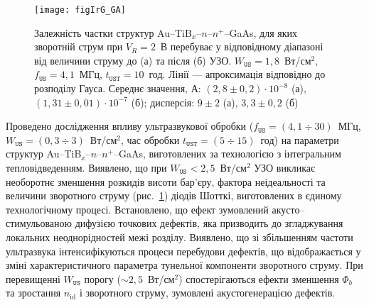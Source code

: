 \begin{figure}[b]
\center
\texttt{[image: figIrG\_GA]}%
\caption{\label{figIrG_GA}
Залежність частки структур Au--TiB$_x$--$n$--$n^+$--GaAs, для яких зворотній струм при $V_R=2$~В перебуває у відповідному діапазоні
від величини струму
до (а) та після (б) УЗО.
$W_\mathtt{US}=1,8$~Вт/см$^2$, $f_\mathtt{US}=4,1$~МГц, $t_\mathtt{UST}=10$~год.
Лінії --- апроксимація відповідно до розподілу Гауса.
Середнє значення, А:
$(2,8\pm0,2)\cdot10^{-8}$ (а),
$(1,31\pm0,01)\cdot10^{-7}$ (б);
дисперсія:
$9\pm2$ (а),
$3,3\pm0,2$ (б)
}
\end{figure}


Проведено дослідження впливу ультразвукової обробки
($f_\mathtt{US}=(4,1\div30)$~МГц, $W_\mathtt{US}=(0,3\div3)$~Вт/см$^2$, час обробки $t_\mathtt{UST}=(5\div15)$~год) на параметри структур
Au--TiB$_x$--$n$--$n^+$--GaAs, виготовлених
за технологією з інтегральним тепловідведенням.
Виявлено, що при $W_\mathtt{US}<2,5$~Вт/см$^2$ УЗО викликає необоротнє зменшення розкидів висоти бар'єру, фактора неідеальності та величини зворотного струму (рис.~\ref{figIrG_GA})
діодів Шотткі, виготовлених в єдиному технологічному процесі.
Встановлено, що ефект зумовлений акусто--стимульованою дифузією точкових дефектів, яка призводить до згладжування локальних неоднорідностей межі розділу.
Виявлено, що зі збільшенням частоти ультразвука інтенсифікуються процеси перебудови дефектів, що відображається у зміні характеристичного  параметра тунельної компоненти зворотного
струму.
При перевищенні $W_\mathtt{US}$ порогу ($\sim2,5$~Вт/см$^2$) спостерігаються ефекти зменшення $\Phi_b$ та зростання $n_\mathrm{id}$ і зворотного струму, 
зумовлені акустогенерацією дефектів.



